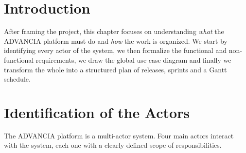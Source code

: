 

\section{Introduction}

After framing the project, this chapter focuses on understanding \textit{what} the ADVANCIA platform must do and \textit{how} the work is organized. We start by identifying every actor of the system, we then formalize the functional and non-functional requirements, we draw the global use case diagram and finally we transform the whole into a structured plan of releases, sprints and a Gantt schedule.

\section{Identification of the Actors}

The ADVANCIA platform is a multi-actor system. Four main actors interact with the system, each one with a clearly defined scope of responsibilities.

